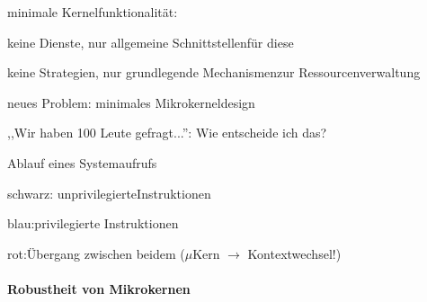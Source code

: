 \documentclass[a4paper]{article}
\begin{document}
\begin{multicols}{3}
    \begin{itemize*}
        \item
        \item
        minimale Kernelfunktionalität:
        \item
        keine Dienste, nur allgemeine Schnittstellenfür diese
        \item
        keine Strategien, nur grundlegende Mechanismenzur Ressourcenverwaltung
        \item
        neues Problem: minimales Mikrokerneldesign
        \item
        ,,Wir haben 100 Leute gefragt...'': Wie entscheide ich das?
        \item
        \begin{itemize*}
            \item Ablauf eines Systemaufrufs
            \item schwarz: unprivilegierteInstruktionen
            \item blau:privilegierte Instruktionen
            \item rot:Übergang zwischen beidem ($\mu$Kern $\rightarrow$ Kontextwechsel!)
        \end{itemize*}
    \end{itemize*}


    \paragraph{Robustheit von
        Mikrokernen}


\end{multicols}
\end{document}
